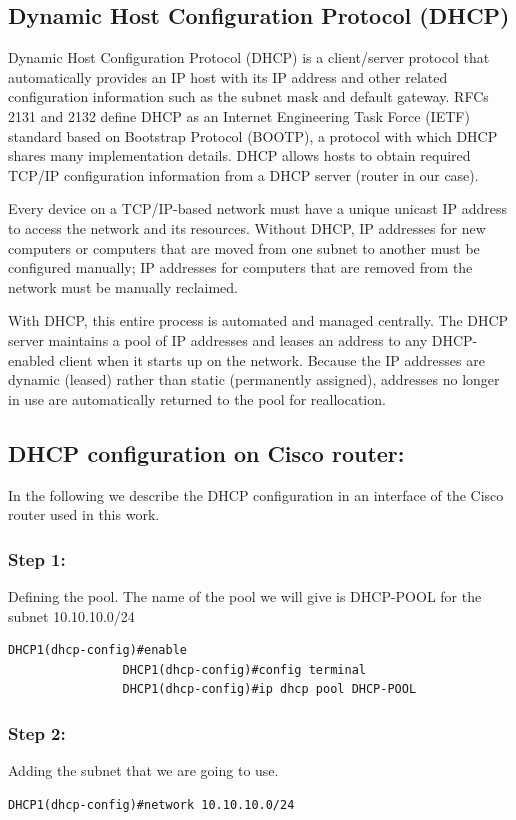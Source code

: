 \subsection{Dynamic Host Configuration Protocol (DHCP)}
Dynamic Host Configuration Protocol (DHCP) is a client/server protocol that automatically provides an \gls{IP} host with its IP address and other related configuration information such as the subnet mask and default gateway. RFCs 2131 and 2132 define DHCP as an Internet Engineering Task Force (IETF) standard based on Bootstrap Protocol (BOOTP), a protocol with which DHCP shares many implementation details. DHCP allows hosts to obtain required TCP/IP configuration information from a DHCP server (router in our case).

Every device on a TCP/IP-based network must have a unique unicast IP address to access the network and its resources. Without DHCP, IP addresses for new computers or computers that are moved from one subnet to another must be configured manually; IP addresses for computers that are removed from the network must be manually reclaimed.

With DHCP, this entire process is automated and managed centrally. The DHCP server maintains a pool of IP addresses and leases an address to any DHCP-enabled client when it starts up on the network. Because the IP addresses are dynamic (leased) rather than static (permanently assigned), addresses no longer in use are automatically returned to the pool for reallocation.

\subsection{DHCP configuration on Cisco router:}
In the following we describe the DHCP configuration in an interface of the Cisco router used in this work. 

\subsubsection{Step 1:}
Defining the pool. The name of the pool we will give is DHCP-POOL for the subnet 10.10.10.0/24
\begin{lstlisting}[style=cliStyle,  backgroundcolor=\color{codebackground}]
                DHCP1(dhcp-config)#enable
                DHCP1(dhcp-config)#config terminal
                DHCP1(dhcp-config)#ip dhcp pool DHCP-POOL
\end{lstlisting}

\subsubsection{Step 2:}
Adding the subnet that we are going to use.
\begin{lstlisting}[style=cliStyle,  backgroundcolor=\color{codebackground}]
                DHCP1(dhcp-config)#network 10.10.10.0/24
\end{lstlisting}

